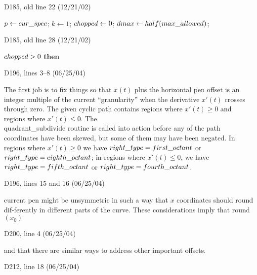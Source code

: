 {{\bugonpage D185, old line 22 (12/21/02)

\ninepoint\noindent
\quad$p\gets\\{cur\_spec}$; $k\gets1$; $\\{chopped}\gets0$;
 $\\{dmax}\gets\\{half}(\\{max\_allowed})$;

\bugonpage D185, old line 28 (12/21/02)

\ninepoint\noindent
{} $\\{chopped}>0$ {\bf then}

\bugonpage D196, lines 3--8 (06/25/04)

The first job is to fix things so that $x(t)$ plus the horizontal
pen offset is an integer multiple of the
current ``granularity'' when the derivative $x'(t)$ crosses through zero.
The given cyclic path contains regions where $x'(t)\ge0$ and regions
where $x'(t)\le0$. The \\{quadrant\_subdivide} routine is called into action
before any of the path coordinates have been skewed, but some of them
may have been negated. In regions where $x'(t)\ge0$ we have $\\{right\_type}=%
\\{first\_octant}$ or $\\{right\_type}=\\{eighth\_octant}$; in regions where
$x'(t)\le0$,
we have $\\{right\_type}=\\{fifth\_octant}$ or $\\{right\_type}=\\{fourth%
\_octant}$.

\bugonpage D196, lines 15 and 16 (06/25/04)

\noindent
current pen might be unsymmetric in such a way that $x$ coordinates
should round dif-\break ferently in different parts of the curve.
These considerations imply that round$(x_0)$\cutpar

\bugonpage D200, line 4 (06/25/04)

\noindent
and that there are similar ways to address other important offsets.\par
\smallskip{}

\bugonpage D212, line 18 (06/25/04)

}}
